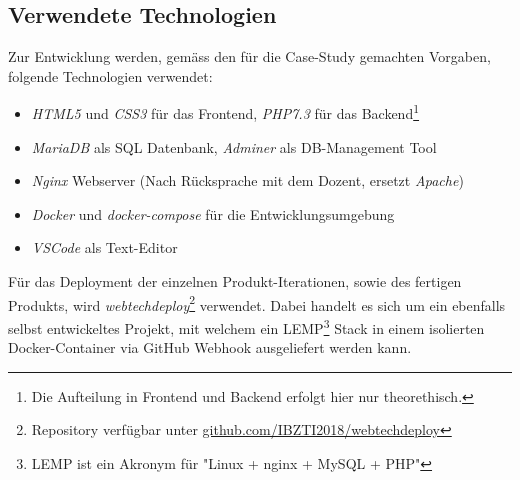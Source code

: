 \subsection{Verwendete Technologien}

Zur Entwicklung werden, gemäss den für die Case-Study gemachten Vorgaben, folgende Technologien verwendet:

\begin{itemize}
  \item \emph{HTML5} und \emph{CSS3} für das Frontend, \emph{PHP7.3} für das Backend\footnote{Die Aufteilung in Frontend und Backend erfolgt hier nur theorethisch.}
  \item \emph{MariaDB} als SQL Datenbank, \emph{Adminer} als DB-Management Tool
  \item \emph{Nginx} Webserver (Nach Rücksprache mit dem Dozent, ersetzt \emph{Apache})
  \item \emph{Docker} und \emph{docker-compose} für die Entwicklungsumgebung
  \item \emph{VSCode} als Text-Editor
\end{itemize}

\noindent
Für das Deployment der einzelnen Produkt-Iterationen, sowie des fertigen Produkts, wird \emph{webtechdeploy}\footnote{Repository verfügbar unter \href{https://github.com/IBZTI2018/webtechdeploy}{github.com/IBZTI2018/webtechdeploy}} verwendet.
Dabei handelt es sich um ein ebenfalls selbst entwickeltes Projekt, mit welchem ein LEMP\footnote{LEMP ist ein Akronym für "Linux + nginx + MySQL + PHP"} Stack in einem isolierten Docker-Container via GitHub Webhook ausgeliefert werden kann.
